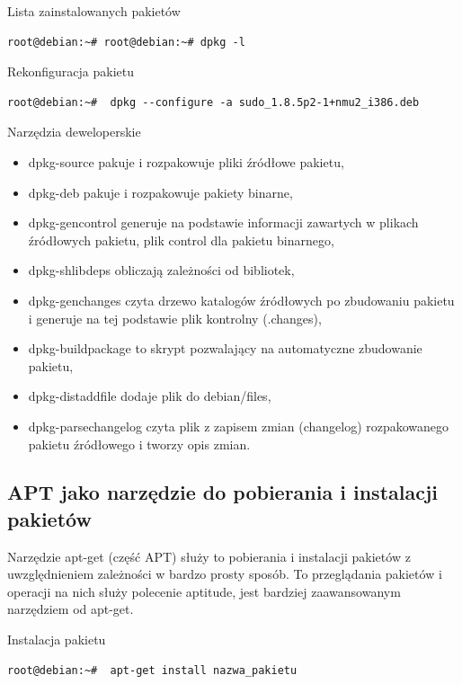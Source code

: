 \newline
Lista zainstalowanych pakietów
\begin{lstlisting}
root@debian:~# root@debian:~# dpkg -l
\end{lstlisting}

\newline
Rekonfiguracja pakietu
\begin{lstlisting}
root@debian:~#  dpkg --configure -a sudo_1.8.5p2-1+nmu2_i386.deb 
\end{lstlisting}

\newline
Narzędzia deweloperskie 

\begin{itemize}
	\item dpkg-source pakuje i rozpakowuje pliki źródłowe pakietu,
	\item dpkg-deb pakuje i rozpakowuje pakiety binarne,
	\item dpkg-gencontrol generuje na podstawie informacji zawartych w plikach źródłowych pakietu, plik control dla pakietu binarnego,
	\item dpkg-shlibdeps obliczają zależności od bibliotek,
	\item dpkg-genchanges czyta drzewo katalogów źródłowych po zbudowaniu pakietu i generuje na tej podstawie plik kontrolny (.changes),
	\item dpkg-buildpackage to skrypt pozwalający na automatyczne zbudowanie pakietu,
	\item dpkg-distaddfile dodaje plik do debian/files,
	\item dpkg-parsechangelog czyta plik z zapisem zmian (changelog) rozpakowanego pakietu źródłowego i tworzy opis zmian.
\end{itemize}

\subsection{APT jako narzędzie do pobierania i instalacji pakietów}

Narzędzie apt-get (część APT) służy to pobierania i instalacji pakietów z uwzględnieniem zależności w bardzo prosty sposób. To przeglądania pakietów i operacji na nich służy polecenie aptitude, jest bardziej zaawansowanym narzędziem od apt-get.

\newline
Instalacja pakietu
\begin{lstlisting}
root@debian:~#  apt-get install nazwa_pakietu
\end{lstlisting}


